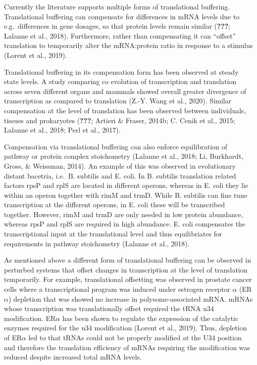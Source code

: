 \documentclass[12pt,openany]{book}
\begin{document}
Currently the literature supports multiple forms of translational
buffering. Translational buffering can compensate for differences in
mRNA levels due to e.g.~differences in gene dosages, so that protein
levels remain similar ({\textbf{???}}; Lalanne et al., 2018).
Furthermore, rather than compensating it can ``offset'' translation to
temporarily alter the mRNA:protein ratio in response to a stimulus
(Lorent et al., 2019).

Translational buffering in its compensation form has been observed at
steady state levels. A study comparing co evolution of transcription and
translation across seven different organs and mammals showed overall
greater divergence of transcription as compared to translation (Z.-Y.
Wang et al., 2020). Similar compensation at the level of translation has
been observed between individuals, tissues and prokaryotes
({\textbf{???}}; Artieri \& Fraser, 2014b; C. Cenik et al., 2015;
Lalanne et al., 2018; Perl et al., 2017).

Compensation via translational buffering can also enforce equilibration
of pathway or protein complex stoichometry (Lalanne et al., 2018; Li,
Burkhardt, Gross, \& Weissman, 2014). An example of this was observed in
evolutionary distant bacetria, i.e.~B. subtilis and E. coli. In B.
subtilis translation related factors rpsP and rplS are located in
different operons, whereas in E. coli they lie within an operon together
with rimM and trmD. While B. subtilis can fine tune transcription at the
different operons, in E. coli these will be transcribed together.
However, rimM and trmD are only needed in low protein abundance, whereas
rpsP and rplS are required in high abundance. E. coli compensates the
transcriptional input at the translational level and thus equilibriates
for requirements in pathway stoichometry (Lalanne et al., 2018).

As mentioned above a different form of translational buffering can be
observed in perturbed systems that offset changes in transcription at
the level of translation temporarily. For example, translational
offsetting was observed in prostate cancer cells where a transcriptional
program was induced under estrogen receptor \(\alpha\) (ER\(\alpha\))
depletion that was showed no increase in polysome-associated mRNA. mRNAs
whose transcription was translationally offset required the tRNA u34
modification. ER\(\alpha\) has been shown to regulate the expression of
the catalytic enzymes required for the u34 modification (Lorent et al.,
2019). Thus, depletion of ER\(\alpha\) led to that tRNAs could not be
properly modified at the U34 position and therefore the translation
efficiency of mRNAs requiring the modification was reduced despite
increased total mRNA levels. \newline
\end{document}
